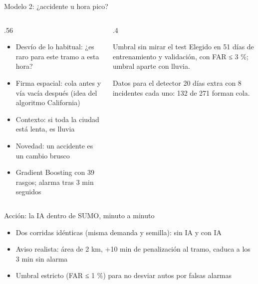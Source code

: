 \documentclass[aspectratio=169,10pt]{beamer}
\begin{document}
\begin{frame}{Modelo 2: ¿accidente u hora pico?}
\begin{columns}[c]
\begin{column}{.56\textwidth}
\small
\begin{itemize}
\item \alert{Desvío de lo habitual}: ¿es raro para este tramo a esta hora?
\item \alert{Firma espacial}: cola antes y vía vacía después (idea del algoritmo California)
\item \alert{Contexto}: si toda la ciudad está lenta, es lluvia
\item \alert{Novedad}: un accidente es un cambio brusco
\item Gradient Boosting con 39 rasgos; alarma tras 3 min seguidos
\end{itemize}
\end{column}
\begin{column}{.4\textwidth}
\begin{block}{Umbral sin mirar el test}
\small Elegido en 51 días de entrenamiento y validación, con FAR ≤ 3 \%; umbral aparte con lluvia.
\end{block}
\begin{block}{Datos para el detector}
\small 20 días extra con 8 incidentes cada uno: 132 de 271 forman cola.
\end{block}
\end{column}
\end{columns}
\end{frame}

\begin{frame}{Acción: la IA dentro de SUMO, minuto a minuto}
\centering
{}
\vspace{12pt}
\begin{itemize}\small
\item Dos corridas \alert{idénticas} (misma demanda y semilla): sin IA y con IA
\item Aviso realista: área de 2 km, +10 min de penalización al tramo, \alert{caduca a los 3 min} sin alarma
\item Umbral estricto (FAR ≤ 1 \%) para no desviar autos por falsas alarmas
\end{itemize}
\end{frame}
\end{document}
